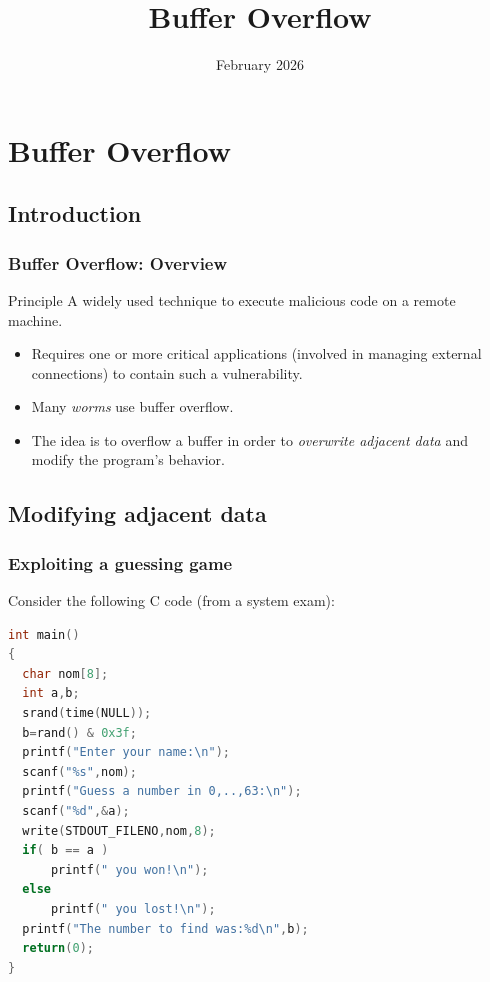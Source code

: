 \documentclass{beamer}
\title{Buffer Overflow}
\date{February 2026}
\newcommand{\enlight}[1]{\textit{\color{blue}#1}}
\begin{document}
\maketitle



\section{Buffer Overflow}

\subsection{Introduction}

\begin{frame}
\frametitle{Buffer Overflow: Overview}

\begin{block}{Principle}
A widely used technique to execute malicious code on a remote machine.
\end{block}

\begin{itemize}
\item Requires one or more critical applications (involved in managing external connections) to contain such a vulnerability.
\item Many \enlight{worms} use buffer overflow.
\item The idea is to overflow a buffer in order to \enlight{overwrite adjacent data} and modify the program's behavior.
\end{itemize}

\end{frame}


\subsection{Modifying adjacent data}

\begin{frame}[fragile]
\frametitle{Exploiting a guessing game}

Consider the following C code (from a system exam):

\begin{lstlisting}[language=C]
int main()
{
  char nom[8];
  int a,b;
  srand(time(NULL));
  b=rand() & 0x3f;
  printf("Enter your name:\n");
  scanf("%s",nom);
  printf("Guess a number in 0,..,63:\n");
  scanf("%d",&a);
  write(STDOUT_FILENO,nom,8);
  if( b == a )
      printf(" you won!\n");
  else
      printf(" you lost!\n");
  printf("The number to find was:%d\n",b);
  return(0);
}
\end{lstlisting}

\end{frame}
\end{document}
